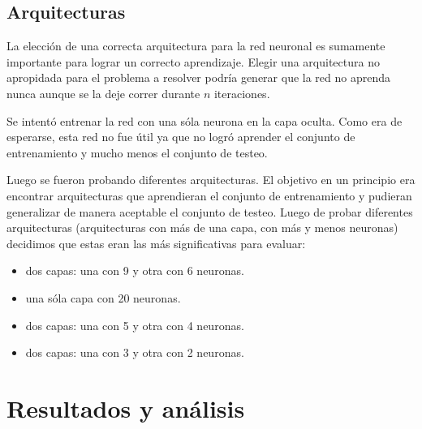 \documentclass[11pt]{article}
\begin{document}
    \subsection{Arquitecturas}
    \par La elección de una correcta arquitectura para la red neuronal es sumamente importante para lograr un correcto aprendizaje. Elegir una arquitectura no apropidada para el problema a resolver podría generar que la red no aprenda nunca aunque se la deje correr durante $n$ iteraciones.
    \par Se intentó entrenar la red con una sóla neurona en la capa oculta. Como era de esperarse, esta red no fue útil ya que no logró aprender el conjunto de entrenamiento y mucho menos el conjunto de testeo.
    \par Luego se fueron probando diferentes arquitecturas. El objetivo en un principio era encontrar arquitecturas que aprendieran el conjunto de entrenamiento y pudieran generalizar de manera aceptable el conjunto de testeo. Luego de probar diferentes arquitecturas (arquitecturas con más de una capa, con más y menos neuronas) decidimos que estas eran las más significativas para evaluar:
        \begin{itemize}
            \item dos capas: una con 9 y otra con 6 neuronas.
            \item una sóla capa con 20 neuronas.
            \item dos capas: una con 5 y otra con 4 neuronas.
            \item dos capas: una con 3 y otra con 2 neuronas.
        \end{itemize}
\section{Resultados y análisis}
\end{document}
